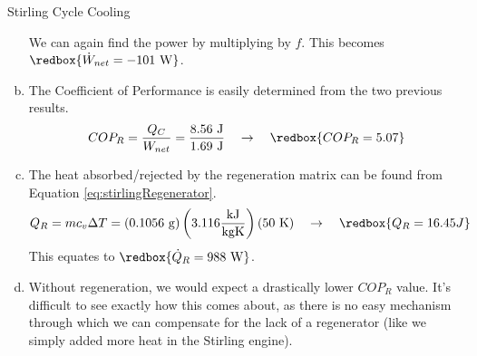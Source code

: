 \begin{example}[label={ex:StirlingCooling}]{Stirling Cycle Cooling}
\begin{enumerate}[a)]
  We can again find the power by multiplying by $f$.  This becomes $\redbox{\dot{W}_{net} = -101\rm\ W}$.
\item The Coefficient of Performance is easily determined from the two previous results.
  \begin{equation*}
    COP_R = \frac{Q_C}{W_{net}} = \frac{8.56\ \rm J}{1.69\ \rm J} \quad\rightarrow\quad \redbox{COP_R = 5.07}
  \end{equation*}

\item The heat absorbed/rejected by the regeneration matrix can be found from Equation \ref{eq:stirlingRegenerator}.
  \begin{equation*}
    Q_R = m c_v \Delta T = ({0.1056\ \rm g})\left(3.116\frac{\rm kJ}{\rm kg K}\right) (50\ {\rm K}) \quad\rightarrow\quad \redbox{Q_R = 16.45 J}
  \end{equation*}
  This equates to $\redbox{\dot{Q}_{R} = 988\rm\ W}$.
\item Without regeneration, we would expect a drastically lower $COP_R$ value.  It's difficult to see exactly how this comes about, as there is no easy mechanism through which we can compensate for the lack of a regenerator (like we simply added more heat in the Stirling engine).
\end{enumerate}


\end{example}

